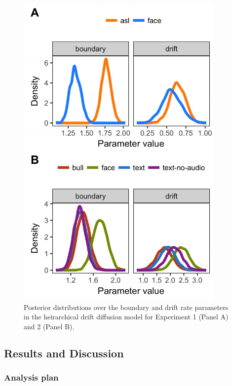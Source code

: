 \documentclass[10pt, letterpaper]{article}
\newenvironment{CodeChunk}{}{}
\begin{document}
\begin{CodeChunk}
\begin{figure}[t]

{\centering \includegraphics{figs/hddm_plot-1} 

}

\caption[Posterior distributions over the boundary and drift rate parameters in the heirarchical drift diffusion model for Experiment 1 (Panel A) and 2 (Panel B)]{Posterior distributions over the boundary and drift rate parameters in the heirarchical drift diffusion model for Experiment 1 (Panel A) and 2 (Panel B).}\label{fig:hddm_plot}
\end{figure}
\end{CodeChunk}

\subsection{Results and Discussion}\label{results-and-discussion}

\subsubsection{Analysis plan}\label{analysis-plan}
\end{document}
